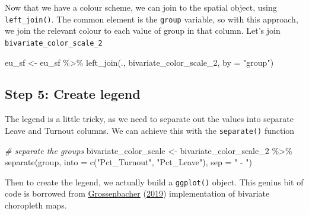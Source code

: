 \documentclass[
]{book}
\newenvironment{Shaded}{\begin{snugshade}}{\end{snugshade}}
\newcommand{\AttributeTok}[1]{\textcolor[rgb]{0.77,0.63,0.00}{#1}}
\newcommand{\CommentTok}[1]{\textcolor[rgb]{0.56,0.35,0.01}{\textit{#1}}}
\newcommand{\FunctionTok}[1]{\textcolor[rgb]{0.00,0.00,0.00}{#1}}
\newcommand{\NormalTok}[1]{#1}
\newcommand{\OtherTok}[1]{\textcolor[rgb]{0.56,0.35,0.01}{#1}}
\newcommand{\SpecialCharTok}[1]{\textcolor[rgb]{0.00,0.00,0.00}{#1}}
\newcommand{\StringTok}[1]{\textcolor[rgb]{0.31,0.60,0.02}{#1}}
\begin{document}
Now that we have a colour scheme, we can join to the spatial object, using \texttt{left\_join()}. The common element is the \texttt{group} variable, so with this approach, we join the relevant colour to each value of group in that column. Let's join \texttt{bivariate\_color\_scale\_2}

\begin{Shaded}
\begin{Highlighting}[]
\NormalTok{eu\_sf }\OtherTok{\textless{}{-}}\NormalTok{ eu\_sf }\SpecialCharTok{\%\textgreater{}\%}  \FunctionTok{left\_join}\NormalTok{(., bivariate\_color\_scale\_2, }\AttributeTok{by =} \StringTok{"group"}\NormalTok{)}
\end{Highlighting}
\end{Shaded}

\hypertarget{step-5-create-legend}{%
\subsection{Step 5: Create legend}\label{step-5-create-legend}}

The legend is a little tricky, as we need to separate out the values into separate Leave and Turnout columns. We can achieve this with the \texttt{separate()} function

\begin{Shaded}
\begin{Highlighting}[]
\CommentTok{\# separate the groups}
\NormalTok{bivariate\_color\_scale }\OtherTok{\textless{}{-}}\NormalTok{ bivariate\_color\_scale\_2 }\SpecialCharTok{\%\textgreater{}\%}
  \FunctionTok{separate}\NormalTok{(group, }\AttributeTok{into =} \FunctionTok{c}\NormalTok{(}\StringTok{"Pct\_Turnout"}\NormalTok{, }\StringTok{"Pct\_Leave"}\NormalTok{), }\AttributeTok{sep =} \StringTok{" {-} "}\NormalTok{)}
\end{Highlighting}
\end{Shaded}

Then to create the legend, we actually build a \texttt{ggplot()} object. This genius bit of code is borrowed from \protect\hyperlink{ref-Grossenbacher_2019}{Grossenbacher} (\protect\hyperlink{ref-Grossenbacher_2019}{2019}) implementation of bivariate choropleth maps.
\end{document}

